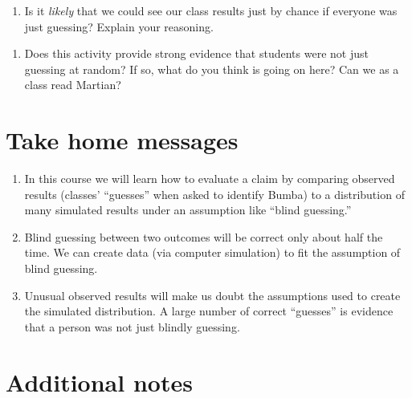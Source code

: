 \documentclass[
]{report}
\providecommand{\tightlist}{%
  \setlength{\itemsep}{0pt}\setlength{\parskip}{0pt}}
\begin{document}
\vspace{1in}

\begin{enumerate}
\def\labelenumi{\arabic{enumi}.}
\setcounter{enumi}{16}
\tightlist
\item
  Is it \emph{likely} that we could see our class results just by chance if everyone was just guessing? Explain your reasoning.
\end{enumerate}

\vspace{1in}

\begin{enumerate}
\def\labelenumi{\arabic{enumi}.}
\setcounter{enumi}{17}
\tightlist
\item
  Does this activity provide strong evidence that students were not just guessing at random? If so, what do you think is going on here? Can we as a class read Martian?
\end{enumerate}

\vspace{1in}

\hypertarget{take-home-messages}{%
\section{Take home messages}\label{take-home-messages}}

\begin{enumerate}
\def\labelenumi{\arabic{enumi}.}
\item
  In this course we will learn how to evaluate a claim by comparing observed results (classes' ``guesses'' when asked to identify Bumba) to a distribution of many simulated results under an assumption like ``blind guessing.''
\item
  Blind guessing between two outcomes will be correct only about half the time. We can create data (via computer simulation) to fit the assumption of blind guessing.
\item
  Unusual observed results will make us doubt the assumptions used to create the simulated distribution. A large number of correct ``guesses'' is evidence that a person was not just blindly guessing.
\end{enumerate}

\hypertarget{additional-notes}{%
\section{Additional notes}\label{additional-notes}}
\end{document}
